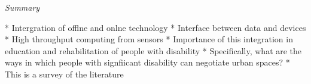\textit{Summary} 

* Intergration of offlne and onlne technology
* Interface between data and devices
* High throughput computing from sensors
* Importance of this integration in education and rehabilitation of people with disability
* Specifically, what are the ways in which people with signfiicant disability can negotiate urban spaces?
* This is a survey of the literature